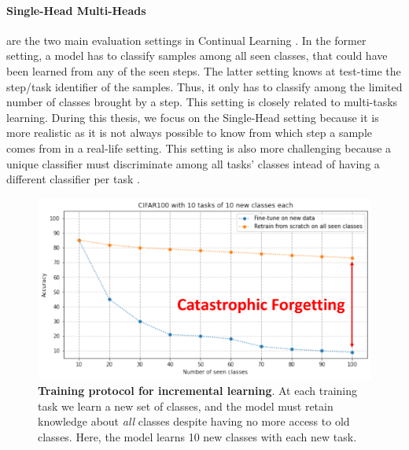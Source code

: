 \paragraph{Single-Head \vs Multi-Heads} are the two main evaluation settings in Continual Learning
\citep{chaudhry2018riemannien_walk}. In the former setting, a model has to classify samples among
all seen classes, that could have been learned from any of the seen steps. The latter setting knows
at test-time the step/task identifier of the samples. Thus, it only has to classify among the limited
number of classes brought by a step. This setting is closely related to multi-tasks learning. During
this thesis, we focus on the Single-Head setting because it is more realistic as it is not always
possible to know from which step a sample comes from in a real-life setting. This setting is also
more challenging because a unique classifier must discriminate among all tasks' classes intead of
having a different classifier per task \citep{lesort2019regulshortcomings}.

\begin{figure}[tb]
      \begin{center}
            \includegraphics[width=0.8\linewidth]{images/related/catastrophic_forgetting.pdf}
      \end{center}
      \caption{\textbf{Training protocol for incremental learning}. At each training task we learn a
            new set of classes, and the model must retain knowledge about \textit{all} classes
            despite having no more access to old classes. Here, the model learns 10 new classes with
            each new task.}
      \label{fig:related_forgetting}
\end{figure}


\label{sec:related_metrics}

